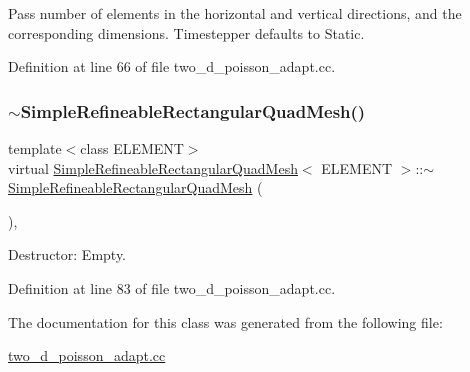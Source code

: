 Pass number of elements in the horizontal and vertical directions, and the corresponding dimensions. Timestepper defaults to Static. 



Definition at line 66 of file two\+\_\+d\+\_\+poisson\+\_\+adapt.\+cc.

\mbox{\label{classSimpleRefineableRectangularQuadMesh_a8f258e0b5178ccb33f0596ae5a33c3c5}} 
\subsubsection{\texorpdfstring{$\sim$\+Simple\+Refineable\+Rectangular\+Quad\+Mesh()}{~SimpleRefineableRectangularQuadMesh()}}
{\footnotesize\ttfamily template$<$class E\+L\+E\+M\+E\+NT$>$ \\
virtual \hyperlink{classSimpleRefineableRectangularQuadMesh}{Simple\+Refineable\+Rectangular\+Quad\+Mesh}$<$ E\+L\+E\+M\+E\+NT $>$\+::$\sim$\hyperlink{classSimpleRefineableRectangularQuadMesh}{Simple\+Refineable\+Rectangular\+Quad\+Mesh} (\begin{DoxyParamCaption}{ }\end{DoxyParamCaption})\hspace{0.3cm}{\ttfamily [inline]}, {\ttfamily [virtual]}}



Destructor\+: Empty. 



Definition at line 83 of file two\+\_\+d\+\_\+poisson\+\_\+adapt.\+cc.



The documentation for this class was generated from the following file\+:\begin{DoxyCompactItemize}
\item 
\hyperlink{two__d__poisson__adapt_8cc}{two\+\_\+d\+\_\+poisson\+\_\+adapt.\+cc}\end{DoxyCompactItemize}
